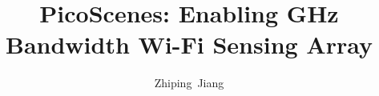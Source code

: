 \documentclass{sig-alternate-10pt}
\def\ourprotocol{{PicoScenes}\xspace}
\def\titletext{{\ourprotocol: Enabling GHz Bandwidth Wi-Fi Sensing Array}\xspace}
\begin{document}
\title{\titletext}

\author{Zhiping~Jiang}

\maketitle
\end{document}
